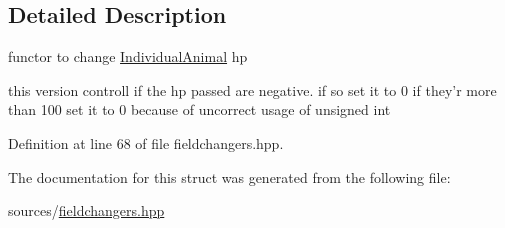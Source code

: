 \subsection{Detailed Description}
functor to change \hyperlink{classIndividualAnimal}{IndividualAnimal} hp 

this version controll if the hp passed are negative. if so set it to 0 if they'r more than 100 set it to 0 because of uncorrect usage of unsigned int 

Definition at line 68 of file fieldchangers.hpp.



The documentation for this struct was generated from the following file:\begin{DoxyCompactItemize}
\item 
sources/\hyperlink{fieldchangers_8hpp}{fieldchangers.hpp}\end{DoxyCompactItemize}
